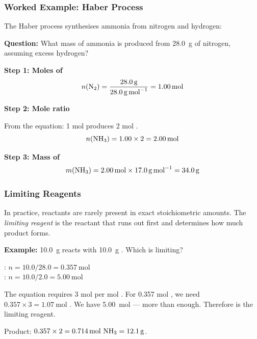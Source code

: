 \documentclass[12pt, a4paper]{book}
\theoremstyle{definition}
\newcommand{\newterm}[1]{\textit{\textcolor{DiscoveryColor}{#1}}}
\begin{document}
\vspace{0.5em}

\subsubsection{Worked Example: Haber Process}

The Haber process synthesises ammonia from nitrogen and hydrogen:
\begin{center}
\end{center}

\textbf{Question:} What mass of ammonia is produced from
\SI{28.0}{\gram} of nitrogen, assuming excess hydrogen?

\textbf{Step 1: Moles of }
\[
n(\ce{N2}) = \frac{\SI{28.0}{\gram}}{\SI{28.0}{\gram\per\mol}} = \SI{1.00}{\mol}
\]

\textbf{Step 2: Mole ratio}

From the equation: 1 mol  produces 2 mol .
\[
n(\ce{NH3}) = 1.00 \times 2 = \SI{2.00}{\mol}
\]

\textbf{Step 3: Mass of }
\[
m(\ce{NH3}) = \SI{2.00}{\mol} \times \SI{17.0}{\gram\per\mol} = \SI{34.0}{\gram}
\]

\subsubsection{Limiting Reagents}

In practice, reactants are rarely present in exact stoichiometric
amounts.
The \newterm{limiting reagent} is the reactant that runs out first
and determines how much product forms.

\textbf{Example:} \SI{10.0}{\gram}  reacts with
\SI{10.0}{\gram} .
Which is limiting?

: $n = 10.0/28.0 = \SI{0.357}{\mol}$\\
: $n = 10.0/2.0  = \SI{5.00}{\mol}$

The equation requires 3 mol  per mol .
For 0.357 mol , we need $0.357 \times 3 = \SI{1.07}{\mol}$ .
We have \SI{5.00}{\mol}  --- more than enough.
Therefore  is the limiting reagent.

Product: $0.357 \times 2 = \SI{0.714}{\mol}\ \ce{NH3}
= \SI{12.1}{\gram}$.
\end{document}
